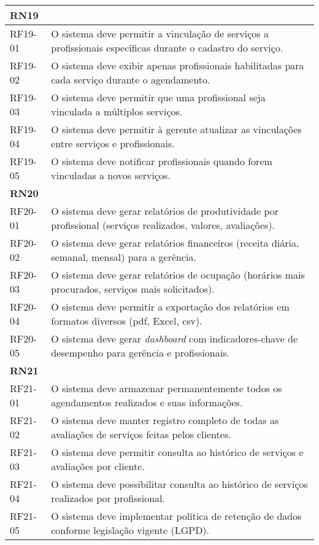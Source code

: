 \begin{longtable}{|p{}|p{}|}
	\multicolumn{2}{|l|}{\textbf{RN19}} \\ \hline
	RF19-01 & O sistema deve permitir a vinculação de serviços a profissionais específicas durante o cadastro do serviço. \\ \hline
	RF19-02 & O sistema deve exibir apenas profissionais habilitadas para cada serviço durante o agendamento. \\ \hline
	RF19-03 & O sistema deve permitir que uma profissional seja vinculada a múltiplos serviços. \\ \hline
	RF19-04 & O sistema deve permitir à gerente atualizar as vinculações entre serviços e profissionais. \\ \hline
	RF19-05 & O sistema deve notificar profissionais quando forem vinculadas a novos serviços. \\ \hline
	
	\multicolumn{2}{|l|}{\textbf{RN20}} \\ \hline
	RF20-01 & O sistema deve gerar relatórios de produtividade por profissional (serviços realizados, valores, avaliações). \\ \hline
	RF20-02 & O sistema deve gerar relatórios financeiros (receita diária, semanal, mensal) para a gerência. \\ \hline
	RF20-03 & O sistema deve gerar relatórios de ocupação (horários mais procurados, serviços mais solicitados). \\ \hline
	RF20-04 & O sistema deve permitir a exportação dos relatórios em formatos diversos (\gls{pdf}, Excel, \gls{csv}). \\ \hline
	RF20-05 & O sistema deve gerar \emph{dashboard} com indicadores-chave de desempenho para gerência e profissionais. \\ \hline
	
	\multicolumn{2}{|l|}{\textbf{RN21}} \\ \hline
	RF21-01 & O sistema deve armazenar permanentemente todos os agendamentos realizados e suas informações. \\ \hline
	RF21-02 & O sistema deve manter registro completo de todas as avaliações de serviços feitas pelos clientes. \\ \hline
	RF21-03 & O sistema deve permitir consulta ao histórico de serviços e avaliações por cliente. \\ \hline
	RF21-04 & O sistema deve possibilitar consulta ao histórico de serviços realizados por profissional. \\ \hline
	RF21-05 & O sistema deve implementar política de retenção de dados conforme legislação vigente (LGPD). \\ \hline
	

\end{longtable}
